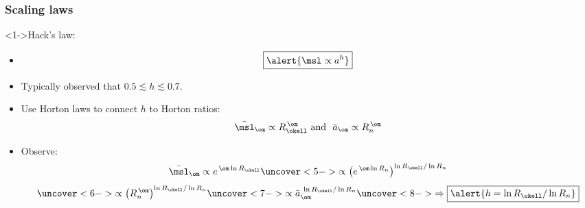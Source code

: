 \begin{frame}[label=]
  \frametitle{Scaling laws}

  \begin{block}<1->{Hack's law:\cite{hack1957a}}
    \begin{itemize}
    \item<1-> 
      $$
      \boxed{\alert{
          \msl \propto a^{h}
        }}
      $$
    \item<2->
      Typically observed that $0.5 \lesssim h \lesssim 0.7$.
    \item<3-> Use Horton laws to connect $h$ to Horton ratios:
      $$
      \bar{\msl}_\om \propto R_\okell^{\, \om}
      \mbox{\ and \ }
      \bar{a}_\om \propto R_n^{\, \om}
      $$
    \item<4->
      Observe:
      $$
      \bar{\msl}_{\om} \propto e^{\, \om \ln R_\okell}
      \uncover<5->{
        \propto \left(e^{\, \om \ln R_n} \right)^{ \ln R_\okell / \ln R_n}
      }
      $$
      $$
      \uncover<6->{
        \propto 
        \left(
          R_n^{\, \om }
        \right)^{\ln R_\okell / \ln R_n}
      }
      \uncover<7->{
        \propto
        \bar{a}_\om^{\ \ln R_\okell / \ln R_n}
      }
      \uncover<8->{
        \Rightarrow \boxed{\alert{ h = \ln R_\okell / \ln R_n}}
      }
      $$
    \end{itemize}
  \end{block}

\end{frame}


